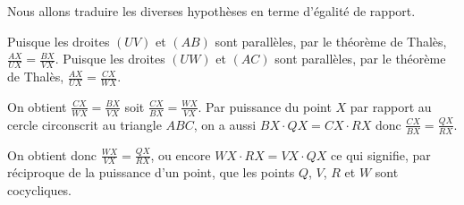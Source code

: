 \begin{sol}
\begin{center}
\end{center}

Nous allons traduire les diverses hypothèses en terme d'égalité de rapport.

Puisque les droites $(UV)$ et $(AB)$ sont parallèles, par le théorème de Thalès, $\frac{AX}{UX} = \frac{BX}{VX}$.
Puisque les droites $(UW)$ et $(AC)$ sont parallèles, par le théorème de Thalès, $\frac{AX}{UX} = \frac{CX}{WX}$.

On obtient $\frac{CX}{WX} = \frac{BX}{VX}$ soit $\frac{CX}{BX} = \frac{WX}{VX}$. Par puissance du point $X$ par rapport au cercle circonscrit au triangle $ABC$, on a aussi $BX\cdot QX = CX\cdot RX$ donc $\frac{CX}{BX} = \frac{QX}{RX}$.

On obtient donc $\frac{WX}{VX} = \frac{QX}{RX}$, ou encore $WX\cdot RX = VX\cdot QX$ ce qui signifie, par réciproque de la puissance d'un point, que les points $Q$, $V$, $R$ et $W$ sont cocycliques.
\end{sol}
